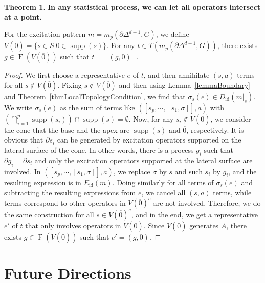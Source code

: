 \documentclass[reprint, amsmath, amssymb, showpacs, floatfix, longbibliography, aps, twocolumn, superscriptaddress, nofootinbib]{revtex4-2}
\newcommand{\supp}{\operatorname{supp}}
\theoremstyle{definition}
\newtheorem{theorem}{Theorem}[section]
\begin{document}
\begin{theorem}\label{thmStar}\textbf{In any statistical process, we can let all operators intersect at a point.}
	
	For the excitation pattern $m=m_p(\partial \Delta^{d+1},G)$, we define $V(\overline{0})=\{s\in S|\overline{0}\in \supp(s)\}$. For any $t\in T(m_p(\partial\Delta^{d+1},G))$, there exists $g\in \operatorname{F}(V(\overline{0}))$ such that $t=[(g,0)]$.
\end{theorem}
\begin{proof}
	We first choose a representative $e$ of $t$, and then annihilate $(s,a)$ terms for all $s\notin V(\overline{0})$. Fixing $s\notin V(\overline{0})$ and then using Lemma~\ref{lemmaBoundary} and Theorem~\ref{thmLocalTopologyCondition}, we find that $\sigma_s(e)\in D_{\operatorname{id}}(m|_s)$. We write $\sigma_s(e)$ as the sum of terms like $([s_p,\cdots,[s_1,\sigma]],a)$ with $(\bigcap_{i=1}^p \supp(s_i))\cap\supp(s)=\emptyset$. Now, for any $s_i\notin V(\overline{0})$, we consider the cone that the base and the apex are $\supp(s)$ and $\overline{0}$, respectively. It is obvious that $\partial s_i$ can be generated by excitation operators supported on the lateral surface of the cone. In other words, there is a process $g_i$ such that $\partial g_i=\partial s_i$ and only the excitation operators supported at the lateral surface are involved. In $([s_p,\cdots,[s_1,\sigma]],a)$, we replace $\sigma$ by $s$ and such $s_i$ by $g_i$, and the resulting expression is in $E_{\operatorname{id}}(m)$. Doing similarly for all terms of $\sigma_s(e)$ and subtracting the resulting expressions from $e$, we cancel all $(s,a)$ terms, while terms correspond to other operators in $V(\overline{0})^c$ are not involved. Therefore, we do the same construction for all $s\in V(\overline{0})^c$, and in the end, we get a representative $e'$ of $t$ that only involves operators in $V(\overline{0})$. Since $V(\overline{0})$ generates $A$, there exists $g\in \operatorname{F}(V(\overline{0}))$ such that $e'=(g,0)$.
\end{proof}




\section{Future Directions}\label{secFuture}
\end{document}
